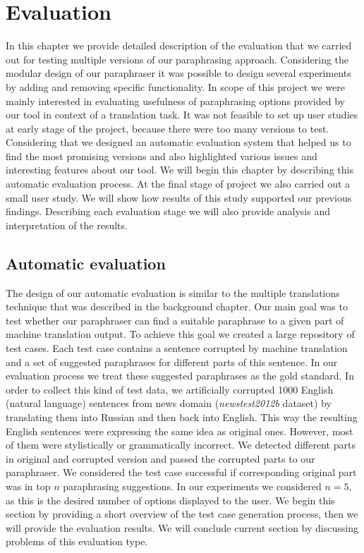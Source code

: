 
\chapter{Evaluation}

In this chapter we provide detailed description of the evaluation that we carried out for testing multiple versions of our paraphrasing approach. Considering the modular design of our paraphraser it was possible to design several experiments by adding and removing specific functionality. In scope of this project we were mainly interested in evaluating usefulness of paraphrasing options provided by our tool in context of a translation task. It was not feasible to set up user studies at early stage of the project, because there were too many versions to test. Considering that we designed an automatic evaluation system that helped us to find the most promising versions and also highlighted various issues and interesting features about our tool. We will begin this chapter by describing this automatic evaluation process. At the final stage of project we also carried out a small user study. We will show how results of this study supported our previous findings. Describing each evaluation stage we will also provide analysis and interpretation of the results.

\section{Automatic evaluation}

The design of our automatic evaluation is similar to the multiple translations technique that was described in the background chapter. Our main goal was to test whether our paraphraser can find a suitable paraphrase to a given part of machine translation output. To achieve this goal we created a large repository of test cases. Each test case contains a sentence corrupted by machine translation and a set of suggested paraphrases for different parts of this sentence. In our evaluation process we treat these suggested paraphrases as the gold standard. In order to collect this kind of test data, we artificially corrupted 1000 English (natural language) sentences from news domain (\emph{newstest2012b} dataset) by translating them into Russian and then back into English. This way the resulting English sentences were expressing the same idea as original ones. However, most of them were stylistically or grammatically incorrect. We detected different parts in original and corrupted version and passed the corrupted parts to our paraphraser. We considered the test case successful if corresponding original part was in top $n$ paraphrasing suggestions. In our experiments we considered $n = 5$, as this is the desired number of options displayed to the user. We begin this section by providing a short overview of the test case generation process, then we will provide the evaluation results. We will conclude current section by discussing problems of this evaluation type.


